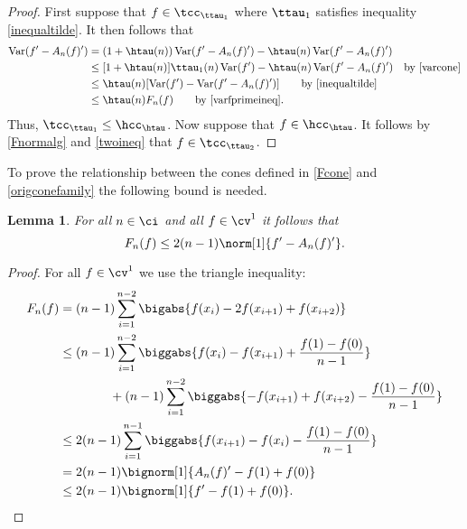 \documentclass[]{elsarticle}
\DeclareMathOperator{\Var}{Var}
\newtheorem{lem}{Lemma}
\theoremstyle{definition}
\theoremstyle{remark}
\begin{document}
\begin{proof} First suppose that $f \in \tcc_{\ttau_1}$ where $\ttau_1$ satisfies inequality \eqref{inequaltilde}.  It then follows that
\begin{align*}
\Var(f'-A_n(f)') & = (1+\htau(n)) \Var(f'-A_n(f)') - \htau(n) \Var(f'-A_n(f)')\\
& \le [1+\htau(n)] \ttau_1(n) \Var(f') - \htau(n) \Var(f'-A_n(f)') \quad \text{by \eqref{varcone}}\\
& \le \htau(n)[ \Var(f') - \Var(f'-A_n(f)')] \qquad \text{by \eqref{inequaltilde}}\\
& \le \htau(n)F_n(f) \qquad \text{by \eqref{varfprimeineq}}.
\end{align*}
Thus, $\tcc_{\ttau_1} \le \hcc_{\htau}$.  Now suppose that $f \in \hcc_{\htau}$.  It follows by \eqref{Fnormalg} and \eqref{twoineq} that $f \in \tcc_{\ttau_2}$.
\end{proof}

To prove the relationship between the cones defined in \eqref{Fcone} and \eqref{origconefamily} the following bound is needed.   

\begin{lem} \label{FnFtnlem}  For all $n \in \ci$ and all $ f \in \cv^1$ it follows that 
\begin{equation}
F_n(f) \le 2(n-1)\norm[1]{f'-A_n(f)'}. \label{Fnupbd}
\end{equation}
\end{lem}
\begin{proof}
For all $f \in \cv^1$ we use the triangle inequality:
\begin{align*} 
\nonumber
F_{n}(f) &= (n-1)\sum_{i=1}^{n-2} \bigabs{f(x_{i}) - 2 f(x_{i+1})+f(x_{i+2})}\\
\nonumber
&\le (n-1)\sum_{i=1}^{n-2} \biggabs{f(x_{i}) - f(x_{i+1})+\frac{f(1)-f(0)}{n-1}}\\
\nonumber
&\qquad \qquad + (n-1)\sum_{i=1}^{n-2} \biggabs{- f(x_{i+1})+f(x_{i+2}) -\frac{f(1)-f(0)}{n-1}}\\
\nonumber
&\le 2 (n-1) \sum_{i=1}^{n-1}\biggabs{f(x_{i+1})-f(x_{i}) - \frac{f(1)-f(0)}{n-1}}\\
\nonumber
&=2(n-1) \bignorm[1]{A_n(f)'-f(1)+f(0)} \\
&\le 2(n-1) \bignorm[1]{f'-f(1)+f(0)} . 
\end{align*}
\end{proof}
\end{document}
